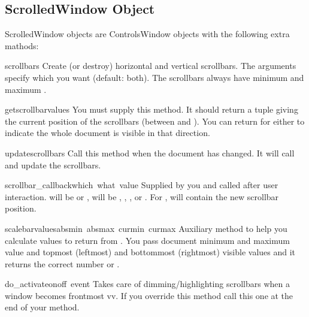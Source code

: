 \subsection{ScrolledWindow Object}

ScrolledWindow objects are ControlsWindow objects with the following
extra mathods:

\renewcommand{\indexsubitem}{(ScrolledWindow method)}

\begin{funcdesc}{scrollbars}{}
Create (or destroy) horizontal and vertical scrollbars. The arguments
specify which you want (default: both). The scrollbars always have
minimum  and maximum .
\end{funcdesc}

\begin{funcdesc}{getscrollbarvalues}{}
You must supply this method. It should return a tuple 
giving the current position of the scrollbars (between  and
). You can return  for either to indicate the
whole document is visible in that direction.
\end{funcdesc}

\begin{funcdesc}{updatescrollbars}{}
Call this method when the document has changed. It will call
 and update the scrollbars.
\end{funcdesc}

\begin{funcdesc}{scrollbar_callback}{which\, what\, value}
Supplied by you and called after user interaction.  will
be  or ,  will be ,
, ,  or . For
,  will contain the new scrollbar position.
\end{funcdesc}

\begin{funcdesc}{scalebarvalues}{absmin\, absmax\, curmin\, curmax}
Auxiliary method to help you calculate values to return from
. You pass document minimum and maximum value
and topmost (leftmost) and bottommost (rightmost) visible values and
it returns the correct number or .
\end{funcdesc}

\begin{funcdesc}{do_activate}{onoff\, event}
Takes care of dimming/highlighting scrollbars when a window becomes
frontmost vv. If you override this method call this one at the end of
your method.
\end{funcdesc}

